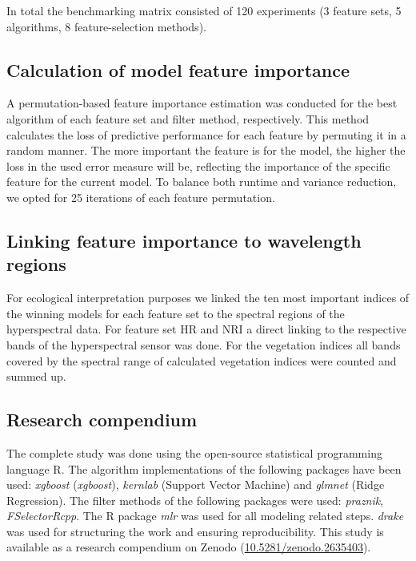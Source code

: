 \documentclass[letterpaper, peerreview]{IEEEtran}
\begin{document}
In total the benchmarking matrix consisted of 120 experiments (3 feature sets, 5 algorithms, 8 feature-selection methods).

\subsection{Calculation of model feature importance}
\noindent A permutation-based feature importance estimation was conducted for the best algorithm of each feature set and filter method, respectively.
This method calculates the loss of predictive performance for each feature by permuting it in a random manner.
The more important the feature is for the model, the higher the loss in the used error measure will be, reflecting the importance of the specific feature for the current model.
To balance both runtime and variance reduction, we opted for 25 iterations of each feature permutation.

\subsection{Linking feature importance to wavelength regions}
\noindent For ecological interpretation purposes we linked the ten most important indices of the winning models for each feature set to the spectral regions of the hyperspectral data.
For feature set HR and NRI a direct linking to the respective bands of the hyperspectral sensor was done.
For the vegetation indices all bands covered by the spectral range of calculated vegetation indices were counted and summed up.

\subsection{Research compendium}

\noindent The complete study was done using the open-source statistical programming language R\cite{rcoreteam2018}.
The algorithm implementations of the following packages have been used: \textit{xgboost}\cite{chen2016} (\textit{xgboost}), \textit{kernlab}\cite{kernlab} (Support Vector Machine) and \textit{glmnet}\cite{glmnet} (Ridge Regression).
The filter methods of the following packages were used: \textit{praznik\cite{praznik}}, \textit{FSelectorRcpp}\cite{fselectorrcpp}.
The R package \textit{mlr}\cite{mlr} was used for all modeling related steps.
\textit{drake} was used for structuring the work and ensuring reproducibility.
This study is available as a research compendium on Zenodo (\url{10.5281/zenodo.2635403}).
\end{document}
